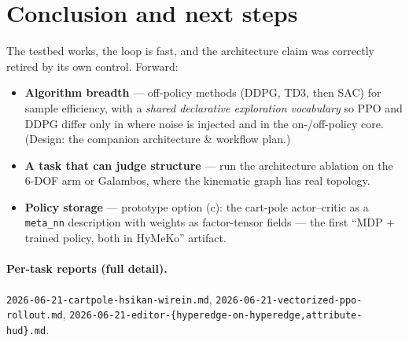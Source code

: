 \documentclass[11pt]{article}
\newcommand{\code}[1]{\texttt{\small #1}}
\begin{document}
\section{Conclusion and next steps}
The testbed works, the loop is fast, and the architecture claim was correctly retired by its own control.
Forward:
\begin{itemize}[nosep]
  \item \textbf{Algorithm breadth} --- off-policy methods (DDPG, TD3, then SAC) for sample efficiency, with a
        \emph{shared declarative exploration vocabulary} so PPO and DDPG differ only in where noise is
        injected and in the on-/off-policy core. (Design: the companion architecture \& workflow plan.)
  \item \textbf{A task that can judge structure} --- run the architecture ablation on the 6-DOF arm or
        Galambos, where the kinematic graph has real topology.
  \item \textbf{Policy storage} --- prototype option (c): the cart-pole actor--critic as a \code{meta\_nn}
        description with weights as factor-tensor fields --- the first ``MDP $+$ trained policy, both in
        HyMeKo'' artifact.
\end{itemize}

\paragraph{Per-task reports (full detail).}
\code{2026-06-21-cartpole-hsikan-wirein.md},
\code{2026-06-21-vectorized-ppo-rollout.md},
\code{2026-06-21-editor-\{hyperedge-on-hyperedge,attribute-hud\}.md}.
\end{document}
